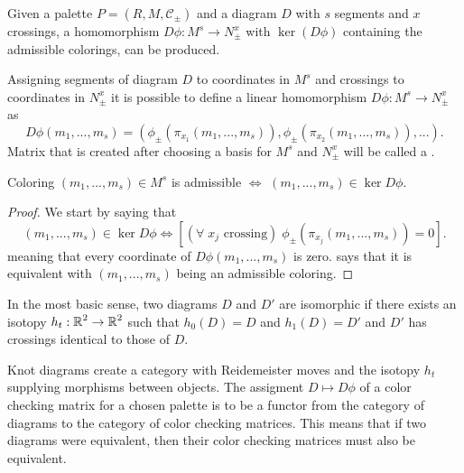 Given a palette $P=(R, M, \mathcal{C}_\pm)$ and a diagram $D$ with $s$ segments and $x$ crossings, a homomorphism $D\phi:M^s\to N_\pm^x$ with $\ker(D\phi)$ containing the admissible colorings, can be produced.

\begin{definition}\label{def:color checking matrix}
  Assigning segments of diagram $D$ to coordinates in $M^s$ and crossings to coordinates in $N_\pm^x$ it is possible to define a linear homomorphism $D\phi:M^s\to N_\pm^x$  as
  $$D\phi(m_1,...,m_s)=(\phi_\pm(\pi_{x_1}(m_1,...,m_s)), \phi_\pm(\pi_{x_2}(m_1,...,m_s)),...).$$
  Matrix that is created after choosing a basis for $M^s$ and $N_\pm^x$ will be called a .
\end{definition}


\begin{proposition}\label{admissible coloring is kernel}
  Coloring $(m_1,...,m_s)\in M^s$ is admissible $\iff$ $(m_1,...,m_s)\in\ker D\phi$.
\end{proposition}

\begin{proof}
  We start by saying that 
  $$(m_1,..., m_s)\in\ker D\phi\iff [(\forall\;x_j\text{ crossing})\;\phi_\pm(\pi_{x_j}(m_1,..., m_s))=0].$$
  meaning that every coordinate of $D\phi(m_1,..., m_s)$ is zero.  says that it is equivalent with $(m_1,..., m_s)$ being an admissible coloring.
\end{proof}

In the most basic sense, two diagrams $D$ and $D'$ are isomorphic if there exists an isotopy $h_t:\operatorname{\mathbb{R}}^2\to \operatorname{\mathbb{R}}^2$ such that $h_0(D)=D$ and $h_1(D)=D'$ and $D'$ has crossings identical to those of $D$.

Knot diagrams create a category with Reidemeister moves and the isotopy $h_t$ supplying morphisms between objects. The assigment $D\mapsto D\phi$ of a color checking matrix for a chosen palette is to be a functor from the category of diagrams to the category of color checking matrices. This means that if two diagrams were equivalent, then their color checking matrices must also be equivalent.

